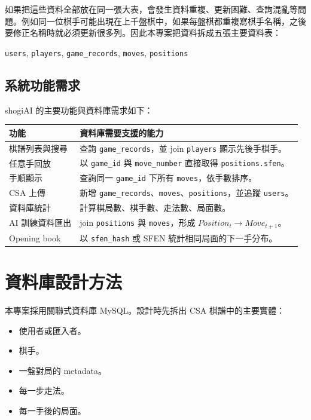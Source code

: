 \documentclass[12pt,a4paper,fontset=none]{ctexart}
\begin{document}
如果把這些資料全部放在同一張大表，會發生資料重複、更新困難、查詢混亂等問題。例如同一位棋手可能出現在上千盤棋中，如果每盤棋都重複寫棋手名稱，之後要修正名稱時就必須更新很多列。因此本專案把資料拆成五張主要資料表：

\begin{center}
\texttt{users}, \texttt{players}, \texttt{game\_records}, \texttt{moves}, \texttt{positions}
\end{center}

\subsection{系統功能需求}

shogiAI 的主要功能與資料庫需求如下：

\begin{longtable}{p{}p{}}
\toprule
\textbf{功能} & \textbf{資料庫需要支援的能力}\\
\midrule
\endhead
棋譜列表與搜尋 & 查詢 \texttt{game\_records}，並 join \texttt{players} 顯示先後手棋手。\\
任意手回放 & 以 \texttt{game\_id} 與 \texttt{move\_number} 直接取得 \texttt{positions.sfen}。\\
手順顯示 & 查詢同一 \texttt{game\_id} 下所有 \texttt{moves}，依手數排序。\\
CSA 上傳 & 新增 \texttt{game\_records}、\texttt{moves}、\texttt{positions}，並追蹤 \texttt{users}。\\
資料庫統計 & 計算棋局數、棋手數、走法數、局面數。\\
AI 訓練資料匯出 & join \texttt{positions} 與 \texttt{moves}，形成 $Position_t \rightarrow Move_{t+1}$。\\
Opening book & 以 \texttt{sfen\_hash} 或 SFEN 統計相同局面的下一手分布。\\
\bottomrule
\end{longtable}

\section{資料庫設計方法}

本專案採用關聯式資料庫 MySQL。設計時先拆出 CSA 棋譜中的主要實體：

\begin{itemize}
  \item 使用者或匯入者。
  \item 棋手。
  \item 一盤對局的 metadata。
  \item 每一步走法。
  \item 每一手後的局面。
\end{itemize}
\end{document}
